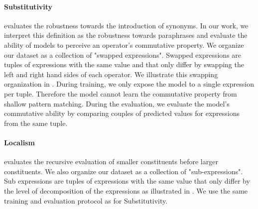 \paragraph{Substitutivity} evaluates the robustness towards the introduction of synonyms. In our work, we interpret this definition as the robustness towards paraphrases and evaluate the ability of models to perceive an operator's commutative property. We organize our dataset as a collection of "swapped expressions". Swapped expressions are tuples of expressions with the same value and that only differ by swapping the left and right hand sides of each operator. We illustrate this swapping organization in . During training, we only expose the model to a single expression per tuple. Therefore the model cannot learn the commutative property from shallow pattern matching. During the evaluation, we evaluate the model's commutative ability by comparing couples of predicted values for expressions from the same tuple. 


\paragraph{Localism} evaluates the recursive evaluation of smaller constituents before larger constituents. We also organize our dataset as a collection of "sub-expressions". Sub expressions are tuples of expressions with the same value that only differ by the level of decomposition of the expressions as illustrated in . We use the same training and evaluation protocol as for Substitutivity.



